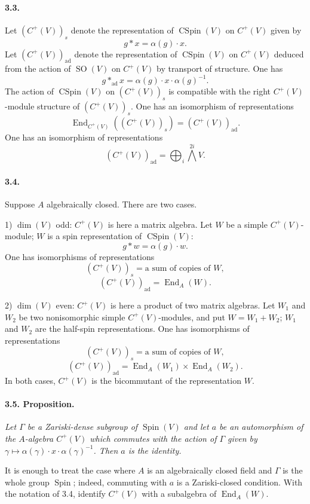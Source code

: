 \documentclass[10pt]{article}
\newcommand{\End}{\operatorname{End}}
\newcommand{\SO}{\operatorname{SO}}
\newcommand{\Spin}{\operatorname{Spin}}
\newcommand{\CSpin}{\operatorname{CSpin}}
\newcommand{\ad}{\operatorname{ad}}
\begin{document}
\paragraph{3.3.} Let $(C^+(V))_s$ denote the representation of $\CSpin(V)$ on $C^+(V)$ given by
\[
\tag{3.3.1}
g*x=\alpha(g)\cdot x.
\]
Let $(C^+(V))_{\ad}$ denote the representation of $\CSpin(V)$ on $C^+(V)$ deduced from the action of $\SO(V)$ on $C^+(V)$ by transport of structure. One has
\[
\tag{3.3.2}
g*_{\ad}x=\alpha(g)\cdot x\cdot\alpha(g)^{-1}.
\]
The action of $\CSpin(V)$ on $(C^+(V))_s$ is compatible with the right $C^+(V)$-module structure of $(C^+(V))_s$. One has an isomorphism of representations
\[
\tag{3.3.3}
\End_{C^+(V)}((C^+(V))_s)=(C^+(V))_{\ad}.
\]
One has an isomorphism of representations
\[
\tag{3.3.4}
(C^+(V))_{\ad}=\bigoplus_i \bigwedge^{2i} V.
\]

\paragraph{3.4.} Suppose $A$ algebraically closed. There are two cases.

1) $\dim(V)$ odd: $C^+(V)$ is here a matrix algebra. Let $W$ be a simple $C^+(V)$-module; $W$ is a spin representation of $\CSpin(V)$:
\[
g*w=\alpha(g)\cdot w.
\]
One has isomorphisms of representations
\[
\tag{3.4.1}
(C^+(V))_s=\text{a sum of copies of }W,
\]
\[
\tag{3.4.2}
(C^+(V))_{\ad}=\End_A(W).
\]

2) $\dim(V)$ even: $C^+(V)$ is here a product of two matrix algebras. Let $W_1$ and $W_2$ be two nonisomorphic simple $C^+(V)$-modules, and put $W=W_1+W_2$; $W_1$ and $W_2$ are the half-spin representations. One has isomorphisms of representations
\[
\tag{3.4.3}
(C^+(V))_s=\text{a sum of copies of }W,
\]
\[
\tag{3.4.4}
(C^+(V))_{\ad}=\End_A(W_1)\times\End_A(W_2).
\]
In both cases, $C^+(V)$ is the bicommutant of the representation $W$.

\paragraph{3.5. Proposition.} \emph{Let $\Gamma$ be a Zariski-dense subgroup of $\Spin(V)$ and let $a$ be an automorphism of the $A$-algebra $C^+(V)$ which commutes with the action of $\Gamma$ given by $\gamma\mapsto\alpha(\gamma)\cdot x\cdot\alpha(\gamma)^{-1}$. Then $a$ is the identity.}

It is enough to treat the case where $A$ is an algebraically closed field and $\Gamma$ is the whole group $\Spin$; indeed, commuting with $a$ is a Zariski-closed condition. With the notation of 3.4, identify $C^+(V)$ with a subalgebra of $\End_A(W)$.
\end{document}
